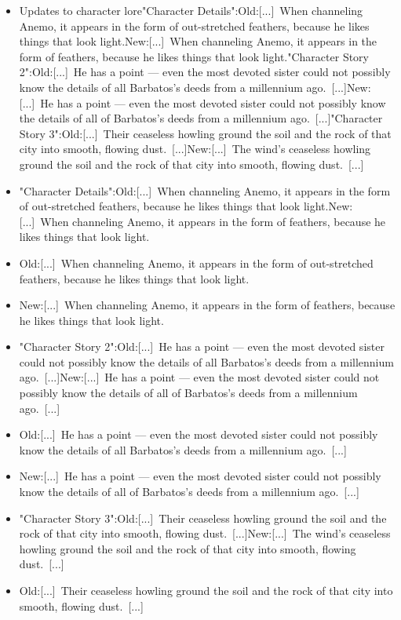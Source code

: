 \documentclass[a4paper,12pt]{article}
\begin{document}
\begin{itemize}
\item Updates to character lore"Character Details":Old:[...] When channeling Anemo, it appears in the form of out-stretched feathers, because he likes things that look light.New:[...] When channeling Anemo, it appears in the form of feathers, because he likes things that look light."Character Story 2":Old:[...] He has a point — even the most devoted sister could not possibly know the details of all Barbatos's deeds from a millennium ago. [...]New:[...] He has a point — even the most devoted sister could not possibly know the details of all of Barbatos's deeds from a millennium ago. [...]"Character Story 3":Old:[...] Their ceaseless howling ground the soil and the rock of that city into smooth, flowing dust. [...]New:[...] The wind's ceaseless howling ground the soil and the rock of that city into smooth, flowing dust. [...]
\item "Character Details":Old:[...] When channeling Anemo, it appears in the form of out-stretched feathers, because he likes things that look light.New:[...] When channeling Anemo, it appears in the form of feathers, because he likes things that look light.
\item Old:[...] When channeling Anemo, it appears in the form of out-stretched feathers, because he likes things that look light.
\item New:[...] When channeling Anemo, it appears in the form of feathers, because he likes things that look light.
\item "Character Story 2":Old:[...] He has a point — even the most devoted sister could not possibly know the details of all Barbatos's deeds from a millennium ago. [...]New:[...] He has a point — even the most devoted sister could not possibly know the details of all of Barbatos's deeds from a millennium ago. [...]
\item Old:[...] He has a point — even the most devoted sister could not possibly know the details of all Barbatos's deeds from a millennium ago. [...]
\item New:[...] He has a point — even the most devoted sister could not possibly know the details of all of Barbatos's deeds from a millennium ago. [...]
\item "Character Story 3":Old:[...] Their ceaseless howling ground the soil and the rock of that city into smooth, flowing dust. [...]New:[...] The wind's ceaseless howling ground the soil and the rock of that city into smooth, flowing dust. [...]
\item Old:[...] Their ceaseless howling ground the soil and the rock of that city into smooth, flowing dust. [...]

\end{itemize}
\end{document}
